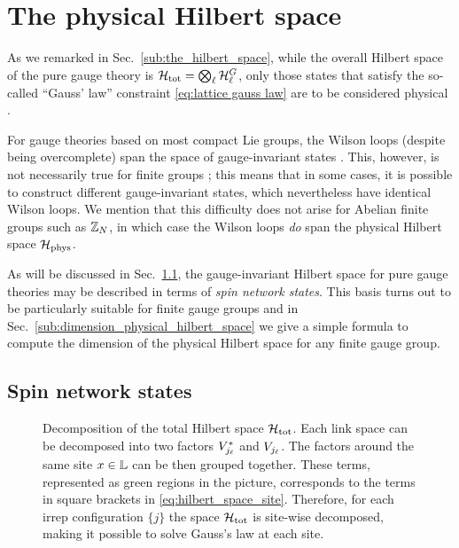 
\section{The physical Hilbert space}\label{sec:physical Hilbert space}

As we remarked in Sec.~\ref{sub:the_hilbert_space}, while the overall Hilbert space of the pure gauge theory is $\mathcal{H}_{\text{tot}} = \bigotimes_{\ell} \mathcal{H}^{G}_{\ell}$, only those states that satisfy the so-called ``Gauss' law'' constraint \eqref{eq:lattice gauss law} are to be considered physical \cite{kogut1975hamiltonian, milstead2018qyangmills, tong2018gauge}.

For gauge theories based on most compact Lie groups, the Wilson loops (despite being overcomplete) span the space of gauge-invariant states \cite{sengupta1994gaugeinvariant, durhuus1980gaugeinvariant}.
This, however, is not necessarily true for finite groups \cite{sengupta1994gaugeinvariant, cui2020kitaev}; this means that in some cases, it is possible to construct different gauge-invariant states, which nevertheless have identical Wilson loops.
We mention that this difficulty does not arise for Abelian finite groups such as $\mathbb{Z}_N$, in which case the Wilson loops \emph{do} span the physical Hilbert space $\mathcal{H}_{\text{phys}}$.

As will be discussed in Sec.~\ref{sec:spin networks pure gauge}, the gauge-invariant Hilbert space for pure gauge theories may be described in terms of \emph{spin network states}. This basis turns out to be particularly suitable for finite gauge groups and in Sec.~\ref{sub:dimension_physical_hilbert_space} we give a simple formula to compute the dimension of the physical Hilbert space for any finite gauge group.

\subsection{Spin network states}\label{sec:spin networks pure gauge}

\begin{figure}[t]
    \centering
    
    \smallskip
    \caption[Decomposition of the total Hilbert space $\HilbertTot$]{%
        Decomposition of the total Hilbert space $\HilbertTot$.
        Each link space can be decomposed into two factors $V_{j_\ell}^{\ast}$ and $V_{j_\ell}$.
        The factors around the same site $x \in \mathbb{L}$ can be then grouped together.
        These terms, represented as green regions in the picture, corresponds to the terms in square brackets in \eqref{eq:hilbert_space_site}.
        Therefore, for each irrep configuration $\{j\}$ the space $\HilbertTot$ is site-wise decomposed, making it possible to solve Gauss's law at each site.
    }
    \label{fig:lattice_decomp}
\end{figure}



